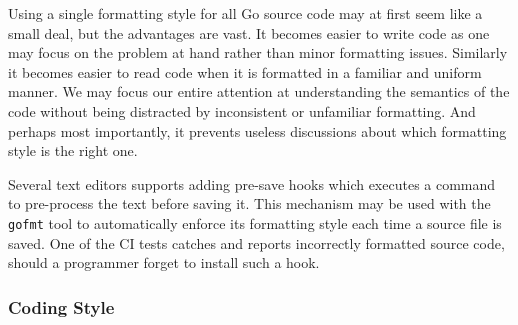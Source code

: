 Using a single formatting style for all Go source code may at first seem like a small deal, but the advantages are vast. It becomes easier to write code as one may focus on the problem at hand rather than minor formatting issues. Similarly it becomes easier to read code when it is formatted in a familiar and uniform manner. We may focus our entire attention at understanding the semantics of the code without being distracted by inconsistent or unfamiliar formatting. And perhaps most importantly, it prevents useless discussions about which formatting style is the right one.

Several text editors supports adding pre-save hooks which executes a command to pre-process the text before saving it. This mechanism may be used with the \texttt{gofmt} tool to automatically enforce its formatting style each time a source file is saved. One of the CI tests catches and reports incorrectly formatted source code, should a programmer forget to install such a hook.

\subsubsection{Coding Style}












